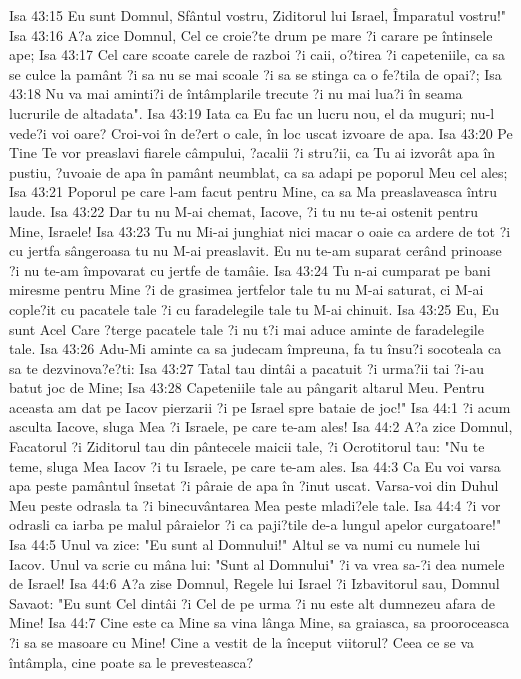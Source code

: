 Isa 43:15  Eu sunt Domnul, Sfântul vostru, Ziditorul lui Israel, Împaratul vostru!"
Isa 43:16  A?a zice Domnul, Cel ce croie?te drum pe mare ?i carare pe întinsele ape;
Isa 43:17  Cel care scoate carele de razboi ?i caii, o?tirea ?i capeteniile, ca sa se culce la pamânt ?i sa nu se mai scoale ?i sa se stinga ca o fe?tila de opai?;
Isa 43:18  Nu va mai aminti?i de întâmplarile trecute ?i nu mai lua?i în seama lucrurile de altadata".
Isa 43:19  Iata ca Eu fac un lucru nou, el da muguri; nu-l vede?i voi oare? Croi-voi în de?ert o cale, în loc uscat izvoare de apa.
Isa 43:20  Pe Tine Te vor preaslavi fiarele câmpului, ?acalii ?i stru?ii, ca Tu ai izvorât apa în pustiu, ?uvoaie de apa în pamânt neumblat, ca sa adapi pe poporul Meu cel ales;
Isa 43:21  Poporul pe care l-am facut pentru Mine, ca sa Ma preaslaveasca întru laude.
Isa 43:22  Dar tu nu M-ai chemat, Iacove, ?i tu nu te-ai ostenit pentru Mine, Israele!
Isa 43:23  Tu nu Mi-ai junghiat nici macar o oaie ca ardere de tot ?i cu jertfa sângeroasa tu nu M-ai preaslavit. Eu nu te-am suparat cerând prinoase ?i nu te-am împovarat cu jertfe de tamâie.
Isa 43:24  Tu n-ai cumparat pe bani miresme pentru Mine ?i de grasimea jertfelor tale tu nu M-ai saturat, ci M-ai cople?it cu pacatele tale ?i cu faradelegile tale tu M-ai chinuit.
Isa 43:25  Eu, Eu sunt Acel Care ?terge pacatele tale ?i nu t?i mai aduce aminte de faradelegile tale.
Isa 43:26  Adu-Mi aminte ca sa judecam împreuna, fa tu însu?i socoteala ca sa te dezvinova?e?ti:
Isa 43:27  Tatal tau dintâi a pacatuit ?i urma?ii tai ?i-au batut joc de Mine;
Isa 43:28  Capeteniile tale au pângarit altarul Meu. Pentru aceasta am dat pe Iacov pierzarii ?i pe Israel spre bataie de joc!"
Isa 44:1  ?i acum asculta Iacove, sluga Mea ?i Israele, pe care te-am ales!
Isa 44:2  A?a zice Domnul, Facatorul ?i Ziditorul tau din pântecele maicii tale, ?i Ocrotitorul tau: "Nu te teme, sluga Mea Iacov ?i tu Israele, pe care te-am ales.
Isa 44:3  Ca Eu voi varsa apa peste pamântul însetat ?i pâraie de apa în ?inut uscat. Varsa-voi din Duhul Meu peste odrasla ta ?i binecuvântarea Mea peste mladi?ele tale.
Isa 44:4  ?i vor odrasli ca iarba pe malul pâraielor ?i ca paji?tile de-a lungul apelor curgatoare!"
Isa 44:5  Unul va zice: "Eu sunt al Domnului!" Altul se va numi cu numele lui Iacov. Unul va scrie cu mâna lui: "Sunt al Domnului" ?i va vrea sa-?i dea numele de Israel!
Isa 44:6  A?a zise Domnul, Regele lui Israel ?i Izbavitorul sau, Domnul Savaot: "Eu sunt Cel dintâi ?i Cel de pe urma ?i nu este alt dumnezeu afara de Mine!
Isa 44:7  Cine este ca Mine sa vina lânga Mine, sa graiasca, sa prooroceasca ?i sa se masoare cu Mine! Cine a vestit de la început viitorul? Ceea ce se va întâmpla, cine poate sa le prevesteasca?
